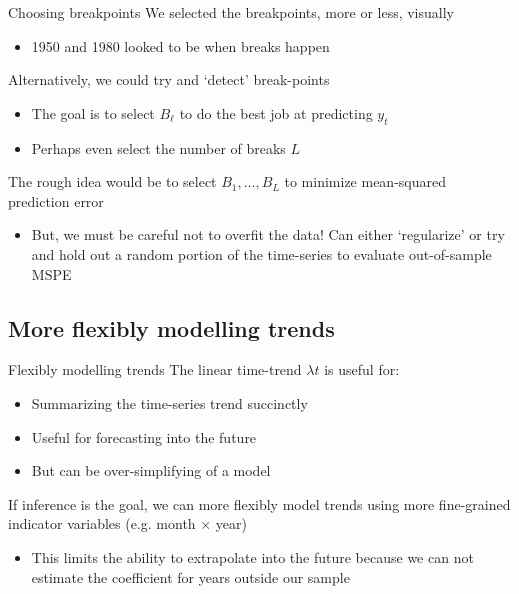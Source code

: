 \documentclass[aspectratio=169,t,11pt,table]{beamer}
\begin{document}
\begin{frame}{Choosing breakpoints}
  We selected the breakpoints, more or less, visually
  \begin{itemize}
    \item 1950 and 1980 looked to be when breaks happen
  \end{itemize}

  \pause
  \bigskip
  Alternatively, we could try and `detect' break-points
  \begin{itemize}
    \item The goal is to select $B_\ell$ to do the best job at predicting $y_t$
    \item Perhaps even select the number of breaks $L$
  \end{itemize}

  \pause
  \bigskip
  The rough idea would be to select $B_1, \dots, B_L$ to minimize mean-squared prediction error
  \begin{itemize}
    \item But, we must be careful not to overfit the data! Can either `regularize' or try and hold out a random portion of the time-series to evaluate out-of-sample MSPE
  \end{itemize} 
\end{frame}



\subsection{More flexibly modelling trends}

\begin{frame}{Flexibly modelling trends}
  The linear time-trend $\lambda t$ is useful for:
  \begin{itemize}
    \item Summarizing the time-series trend succinctly
    
    \item Useful for forecasting into the future

    \item But can be over-simplifying of a model
  \end{itemize}

  \bigskip
  If inference is the goal, we can more flexibly model trends using more fine-grained indicator variables (e.g. month $\times$ year)
  \begin{itemize}
    \item This limits the ability to extrapolate into the future because we can not estimate the coefficient for years outside our sample
  \end{itemize}
\end{frame}
\end{document}
